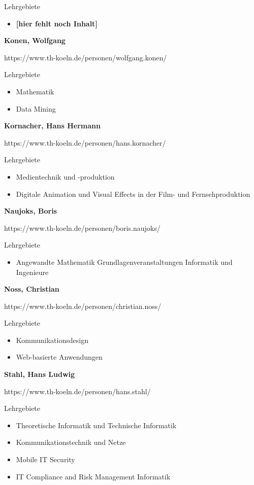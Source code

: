 Lehrgebiete

\begin{itemize}
\tightlist
\item
  \textbf{{[}hier fehlt noch Inhalt{]}}
\end{itemize}

\textbf{Konen, Wolfgang}

https://www.th-koeln.de/personen/wolfgang.konen/

Lehrgebiete

\begin{itemize}
\tightlist
\item
  Mathematik
\item
  Data Mining
\end{itemize}

\textbf{Kornacher, Hans Hermann}

https://www.th-koeln.de/personen/hans.kornacher/

Lehrgebiete

\begin{itemize}
\tightlist
\item
  Medientechnik und -produktion
\item
  Digitale Animation und Visual Effects in der Film- und
  Fernsehproduktion
\end{itemize}

\textbf{Naujoks, Boris}

https://www.th-koeln.de/personen/boris.naujoks/

Lehrgebiete

\begin{itemize}
\tightlist
\item
  Angewandte Mathematik Grundlagenveranstaltungen Informatik und
  Ingenieure
\end{itemize}

\textbf{Noss, Christian}

https://www.th-koeln.de/personen/christian.noss/

Lehrgebiete

\begin{itemize}
\tightlist
\item
  Kommunikationsdesign
\item
  Web-basierte Anwendungen
\end{itemize}

\textbf{Stahl, Hans Ludwig}

https://www.th-koeln.de/personen/hans.stahl/

Lehrgebiete

\begin{itemize}
\tightlist
\item
  Theoretische Informatik und Technische Informatik
\item
  Kommunikationstechnik und Netze
\item
  Mobile IT Security
\item
  IT Compliance and Risk Management Informatik
\end{itemize}

